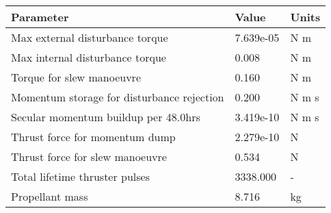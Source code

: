 \begin{tabular}{lll}
\toprule
                                  Parameter &      Value &  Units \\
\midrule
            Max external disturbance torque &  7.639e-05 &    N m \\
            Max internal disturbance torque &      0.008 &    N m \\
                  Torque for slew manoeuvre &      0.160 &    N m \\
 Momentum storage for disturbance rejection &      0.200 &  N m s \\
       Secular momentum buildup per 48.0hrs &  3.419e-10 &  N m s \\
             Thrust force for momentum dump &  2.279e-10 &      N \\
            Thrust force for slew manoeuvre &      0.534 &      N \\
             Total lifetime thruster pulses &   3338.000 &      - \\
                            Propellant mass &      8.716 &     kg \\
\bottomrule
\end{tabular}
